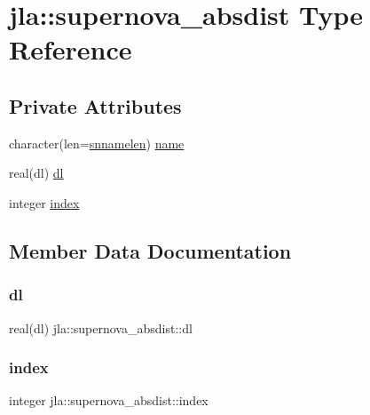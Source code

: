 \hypertarget{structjla_1_1supernova__absdist}{}\section{jla\+:\+:supernova\+\_\+absdist Type Reference}
\label{structjla_1_1supernova__absdist}
\subsection*{Private Attributes}
\begin{DoxyCompactItemize}
\item 
character(len=\mbox{\hyperlink{namespacejla_a211c3f57dbbc51d6959058d935cc0fb6}{snnamelen}}) \mbox{\hyperlink{structjla_1_1supernova__absdist_a73c00a54d10c5d7d9fe9e383f29c1c66}{name}}
\item 
real(dl) \mbox{\hyperlink{structjla_1_1supernova__absdist_aea62d06424f58547495dfcd9a9c145f0}{dl}}
\item 
integer \mbox{\hyperlink{structjla_1_1supernova__absdist_a97ad99a424524d1a8b0ee8d602ea2c28}{index}}
\end{DoxyCompactItemize}


\subsection{Member Data Documentation}
\mbox{\label{structjla_1_1supernova__absdist_aea62d06424f58547495dfcd9a9c145f0}} 
\subsubsection{\texorpdfstring{dl}{dl}}
{\footnotesize\ttfamily real(dl) jla\+::supernova\+\_\+absdist\+::dl\hspace{0.3cm}{\ttfamily [private]}}

\mbox{\label{structjla_1_1supernova__absdist_a97ad99a424524d1a8b0ee8d602ea2c28}} 
\subsubsection{\texorpdfstring{index}{index}}
{\footnotesize\ttfamily integer jla\+::supernova\+\_\+absdist\+::index\hspace{0.3cm}{\ttfamily [private]}}

